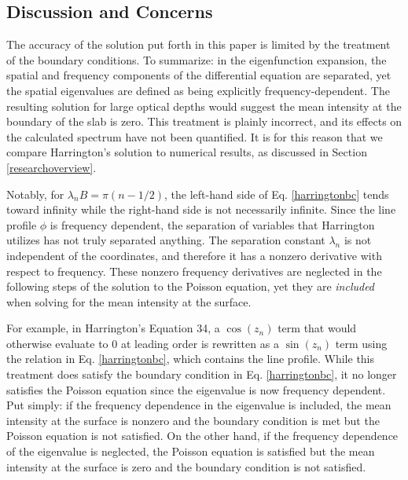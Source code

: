 \documentclass[onecolumn]{aastex63}
\begin{document}
\subsection{Discussion and Concerns} \label{concerns}

The accuracy of the solution put forth in this paper is limited by the treatment of the boundary conditions. To summarize: in the eigenfunction expansion, the spatial and frequency components of the differential equation are separated, yet the spatial eigenvalues are defined as being explicitly frequency-dependent. The resulting solution for large optical depths would suggest the mean intensity at the boundary of the slab is zero. This treatment is plainly incorrect, and its effects on the calculated spectrum have not been quantified. It is for this reason that we compare Harrington's solution to numerical results, as discussed in Section \ref{researchoverview}. 

Notably, for $\lambda_n B = \pi(n-1/2)$, the left-hand side of Eq. \ref{harringtonbc} tends toward infinity while the right-hand side is not necessarily infinite. Since the line profile $\phi$ is frequency dependent, the separation of variables that Harrington utilizes has not truly separated anything. The separation constant $\lambda_n$ is not independent of the coordinates, and therefore it has a nonzero derivative with respect to frequency. These nonzero frequency derivatives are neglected in the following steps of the solution to the Poisson equation, yet they are \textit{included} when solving for the mean intensity at the surface.

For example, in Harrington's Equation 34, a $\cos(z_n)$ term that would otherwise evaluate to 0 at leading order is rewritten as a $\sin(z_n)$ term using the relation in Eq. \ref{harringtonbc}, which contains the line profile. While this treatment does satisfy the boundary condition in Eq. \ref{harringtonbc}, it no longer satisfies the Poisson equation since the eigenvalue is now frequency dependent. Put simply: if the frequency dependence in the eigenvalue is included, the mean intensity at the surface is nonzero and the boundary condition is met but the Poisson equation is not satisfied. On the other hand, if the frequency dependence of the eigenvalue is neglected, the Poisson equation is satisfied but the mean intensity at the surface is zero and the boundary condition is not satisfied.
\end{document}
